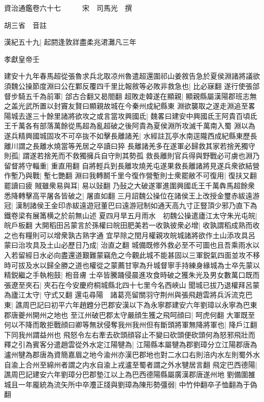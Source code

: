 資治通鑑卷六十七　　　宋　司馬光　撰

胡三省　音註

漢紀五十九|{
	起閼逢敦牂盡柔兆涒灘凡三年}


孝獻皇帝壬

建安十九年春馬超從張魯求兵北取凉州魯遣超還圍祁山姜敘告急於夏侯淵諸將議欲須魏公操節度淵曰公在鄴反覆四千里比報敘等必敗非救急也|{
	比必寐翻}
遂行使張郃督步騎五千為前軍|{
	郃古合翻又曷閤翻}
超敗走韓遂在顯親|{
	顯親縣屬漢陽郡班志無之盖光武所置以封竇友賢曰顯親故城在今秦州成紀縣東}
淵欲襲取之遂走淵追至畧陽城去遂三十餘里諸將欲攻之或言當攻興國氐|{
	魏畧曰建安中興國氐王阿貴百頃氐王千萬各有部落萬餘從馬超為亂超破之後阿貴為夏侯淵所攻滅千萬南入蜀}
淵以為遂兵精興國城固攻不可卒抜不如擊長離諸羌|{
	水經註瓦亭水南逕隴西成紀縣東歷長離川謂之長離水燒當等羌居之卒讀曰猝}
長離諸羌多在遂軍必歸救其家若捨羌獨守則孤|{
	謂遂若捨羌而不救獨擁兵自守則其勢孤}
救長離則官兵得與野戰必可虜也淵乃留督將守輜重|{
	重直用翻}
自將輕兵到長離攻燒羌屯遂果救長離諸將見遂兵衆欲結營作塹乃與戰|{
	塹七艷翻}
淵曰我轉鬭千里今復作營塹則士衆罷敝不可復用|{
	復扶又翻罷讀曰疲}
賊雖衆易與耳|{
	易以䜴翻}
乃鼔之大破遂軍進圍興國氐王千萬犇馬超餘衆悉降轉擊高平屠各皆破之|{
	屠直如翻}
三月詔魏公操位在諸侯王上改授金璽赤紱遠游冠|{
	漢制諸侯王金印赤紱遠遊冠董巴曰遠游冠制如通天高九寸正豎頂少邪乃直下為鐵卷梁有展筩横之於前無山述}
夏四月旱五月雨水　初魏公操遣廬江太守朱光屯皖|{
	皖戶板翻}
大開稻田呂蒙言於孫權曰皖田肥美若一收孰彼衆必增|{
	收孰謂稻成熟而收之也有糧則可以增衆孰古熟字通}
宜早除之閏月權親攻皖城諸將欲作土山添攻具呂蒙曰治攻具及土山必歷日乃成|{
	治直之翻}
城備既修外救必至不可圖也且吾乘雨水以入若留經日水必向盡還道艱難蒙竊危之今觀此城不能甚固以三軍鋭氣四面並攻不移時可拔及水以歸全勝之道也權從之蒙薦甘寧為升城督寧手持練身緣城為士卒先蒙以精鋭繼之手執枹鼓|{
	枹音膚}
士卒皆騰踊侵晨進攻食時破之獲朱光及男女數萬口既而張遼至夾石|{
	夾石在今安慶府桐城縣北四十七里今名西峽山}
聞城已拔乃退權拜呂蒙為廬江太守|{
	守式又翻}
還屯尋陽　諸葛亮留關羽守荆州與張飛趙雲將兵泝流克巴東|{
	譙周巴記曰初平六年趙韙分巴郡安漢以下為永寧郡建安六年劉璋以永寧為巴東郡唐夔州開州之地也}
至江州破巴郡太守嚴顔生獲之飛呵顔曰|{
	呵虎何翻}
大軍既至何以不降而敢拒戰顔曰卿等無狀侵奪我州我州但有斷頭將軍無降將軍也|{
	降戶江翻下同我州謂益州也}
飛怒令左右牽去砍頭顔容止不變曰砍頭便砍頭何為怒邪飛壯而釋之引為賓客分遣趙雲從外水定江陽犍為|{
	江陽縣本屬犍為郡劉璋分立江陽郡唐為瀘州犍為郡唐為資簡嘉眉之地今渝州亦漢巴郡地也對二水口右則涪内水左則蜀外水自渝上合州至綿州者謂之内水自渝上戎瀘至蜀者謂之外水犍居言翻}
飛定巴西德陽|{
	譙周巴記建安六年劉璋分巴郡墊江以上為巴西德陽縣屬廣漢郡唐遂州地}
劉備圍雒城且一年龎統為流矢所中卒灋正牋與劉璋為陳形勢彊弱|{
	中竹仲翻卒子恤翻為于偽翻}
